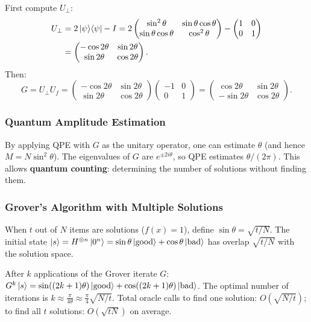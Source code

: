 \documentclass[10pt,a4paper]{article}
\begin{document}
First compute $U_\perp$:
\begin{align*}
U_\perp &= 2\ket{\psi}\!\bra{\psi}-I = 2\begin{pmatrix}\sin^2\theta&\sin\theta\cos\theta\\\sin\theta\cos\theta&\cos^2\theta\end{pmatrix}-\begin{pmatrix}1&0\\0&1\end{pmatrix}\\
&=\begin{pmatrix}-\cos 2\theta&\sin 2\theta\\\sin 2\theta&\cos 2\theta\end{pmatrix}.
\end{align*}
Then:
\[
G=U_\perp U_f = \begin{pmatrix}-\cos 2\theta&\sin 2\theta\\\sin 2\theta&\cos 2\theta\end{pmatrix}\begin{pmatrix}-1&0\\0&1\end{pmatrix}=\begin{pmatrix}\cos 2\theta&\sin 2\theta\\-\sin 2\theta&\cos 2\theta\end{pmatrix}.
\]

\subsubsection*{Quantum Amplitude Estimation}

By applying QPE with $G$ as the unitary operator, one can estimate $\theta$ (and hence $M=N\sin^2\theta$). The eigenvalues of $G$ are $e^{\pm 2i\theta}$, so QPE estimates $\theta/(2\pi)$. This allows \textbf{quantum counting}: determining the number of solutions without finding them.

\subsubsection*{Grover's Algorithm with Multiple Solutions}

When $t$ out of $N$ items are solutions ($f(x)=1$), define $\sin\theta=\sqrt{t/N}$. The initial state $\ket{s}=H^{\otimes n}\ket{0^n}=\sin\theta\ket{\text{good}}+\cos\theta\ket{\text{bad}}$ has overlap $\sqrt{t/N}$ with the solution space.

After $k$ applications of the Grover iterate $G$: $G^k\ket{s}=\sin((2k+1)\theta)\ket{\text{good}}+\cos((2k+1)\theta)\ket{\text{bad}}$. The optimal number of iterations is $k\approx\frac{\pi}{4\theta}\approx\frac{\pi}{4}\sqrt{N/t}$. Total oracle calls to find one solution: $O(\sqrt{N/t})$; to find all $t$ solutions: $O(\sqrt{tN})$ on average.
\end{document}
